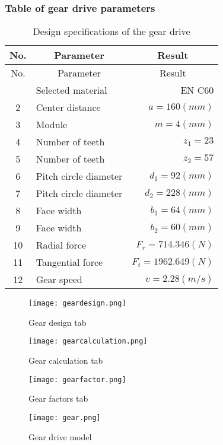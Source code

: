 \subsubsection{Table of gear drive parameters}
\begin{center}
	\begin{longtable}{clr}
		\toprule
		No. & \multicolumn{1}{c}{Parameter} & \multicolumn{1}{c}{Result}\\
		\midrule\endfirsthead
		\toprule
		No. & \multicolumn{1}{c}{Parameter} & \multicolumn{1}{c}{Result}\\
		\midrule\endhead
		\bottomrule\endfoot
		\bottomrule
		\caption{Design specifications of the gear drive}
		\endlastfoot
		1 & Selected material & EN C60\\
		2 & Center distance & $ a=160\unit{(mm)} $\\
		3 & Module & $ m=4\unit{(mm)} $\\
		4 & Number of teeth & $ z_1 =23 $\\
		5 & Number of teeth & $ z_2 =57 $\\
		6 & Pitch circle diameter & $ d_1=92\unit{(mm)} $\\
		7 & Pitch circle diameter & $ d_2=228\unit{(mm)} $\\
		8 & Face width & $ b_1=64\unit{(mm)} $\\
		9 & Face width & $ b_2=60\unit{(mm)} $\\
		10 & Radial force & $ F_r=714.346\unit{(N)} $\\
		11 & Tangential force & $ F_t=1962.649\unit{(N)} $\\
		12 & Gear speed & $ v=2.28\unit{(m/s)} $
	\end{longtable}
\end{center}
\begin{figure}
	\centering
	\texttt{[image: geardesign.png]}
	\caption{Gear design tab}
	\label{geardesign}
\end{figure}
\begin{figure}
	\centering
	\texttt{[image: gearcalculation.png]}
	\caption{Gear calculation tab}
	\label{gearcalculation}
\end{figure}
\begin{figure}
	\centering
	\texttt{[image: gearfactor.png]}
	\caption{Gear factors tab}
	\label{gearfactor}
\end{figure}
\begin{figure}
	\centering
	\texttt{[image: gear.png]}
	\caption{Gear drive model}
	\label{gear}
\end{figure}

